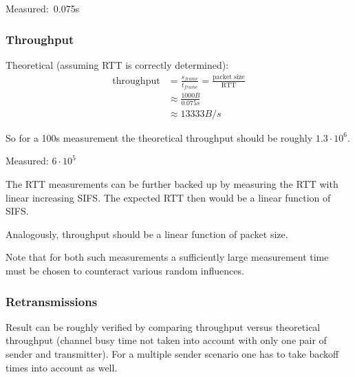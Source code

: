 \documentclass{article}
\begin{document}
\bigskip

Measured:~0.075s 

\subsubsection{Throughput}

\bigskip

Theoretical (assuming RTT is correctly determined):
\begin{equation*}
\begin{split}
	\text{throughput} & = \frac{s_{frame}}{t_{frame}} = \frac{\text{packet size}}{\text{RTT}} \\
	& \approx \frac{1000B}{0.075s} \\
	& \approx 13333B/s
\end{split}
\end{equation*}

So for a 100s measurement the theoretical throughput should be roughly $1.3\cdot 10^6$.

Measured: $6 \cdot 10^5$

\bigskip

The RTT measurements can be further backed up by measuring the RTT with linear increasing SIFS. The expected RTT then would be a linear function of SIFS.

\bigskip

Analogously, throughput should be a linear function of packet size. 

\bigskip

Note that for both such measurements a sufficiently large measurement time must be chosen to counteract various random influences.

\subsubsection{Retransmissions}
Result can be roughly verified by comparing throughput versus theoretical throughput (channel busy time not taken into account with only one pair of sender and transmitter). For a multiple sender scenario one has to take backoff times into account as well.
\end{document}
